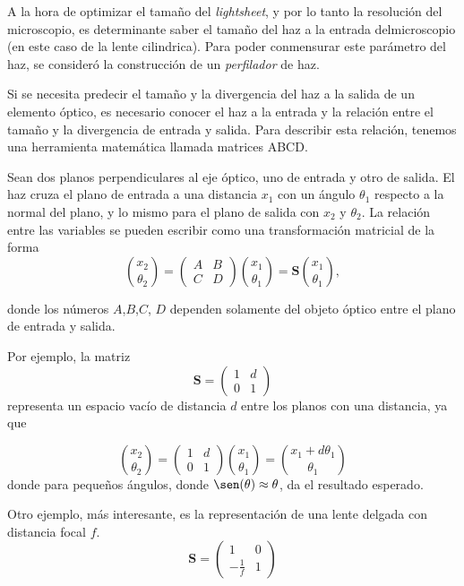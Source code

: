 A la hora de optimizar el tamaño del \textit{lightsheet}, y por lo tanto la resolución del microscopio, es determinante saber el tamaño del haz a la entrada delmicroscopio (en este caso de la lente cilindrica). Para poder conmensurar este parámetro del haz, se consideró la construcción de un \emph{perfilador} de haz.

Si se necesita predecir el tamaño y la divergencia del haz a la salida de un elemento óptico, es necesario conocer el haz a la entrada y la relación entre el tamaño y la divergencia de entrada y salida. Para describir esta relación, tenemos una herramienta matemática llamada matrices ABCD\cite{svelto}.

Sean dos planos perpendiculares al eje óptico, uno de entrada y otro de salida. El haz cruza el plano de entrada a una distancia $x_1$ con un ángulo $\theta_1$ respecto a la normal del plano, y lo mismo para el plano de salida con $x_2$ y $\theta_2$. La relación entre las variables se pueden escribir como una transformación matricial de la forma
\begin{equation}
{x_2 \choose \theta_2} = \begin{pmatrix} A & B \\ C & D \end{pmatrix}{x_1 \choose \theta_1} = \boldsymbol{S}  {x_1 \choose \theta_1} ,
\end{equation}

donde los números $A$,$B$,$C$, $D$ dependen solamente del objeto óptico entre el plano de entrada y salida. 

Por ejemplo, la matriz
\begin{equation}
\boldsymbol{S} = \begin{pmatrix} 1 & d \\ 0 & 1 \end{pmatrix}
\end{equation}
representa un espacio vacío de distancia $d$ entre los planos con una distancia, ya que

\[ {x_2 \choose \theta_2} = \begin{pmatrix} 1 & d \\ 0 & 1 \end{pmatrix}{x_1 \choose \theta_1} = {x_1 + d \theta_1 \choose \theta_1} \]
donde para pequeños ángulos, donde $\sen(\theta) \approx \theta$, da el resultado esperado.

Otro ejemplo, más interesante, es la representación de una lente delgada con distancia focal $f$.
\begin{equation}
\boldsymbol{S} = \begin{pmatrix} 1 & 0 \\ -\frac{1}{f} & 1 \end{pmatrix}
\end{equation}

